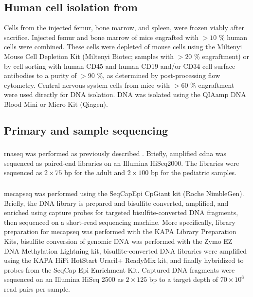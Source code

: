 \subsection{Human cell isolation from }

Cells from the injected femur, bone marrow, and spleen, were frozen viably after sacrifice.
Injected femur and bone marrow of mice engrafted with $> 10$ \% human cells were combined.
These cells were depleted of mouse cells using the Miltenyi Mouse Cell Depletion Kit (Miltenyi Biotec; samples with $> 20$ \% engraftment) or by cell sorting with human CD45 and human CD19 and/or CD34 cell surface antibodies to a purity of $> 90$ \%, as determined by post-processing flow cytometry.
Central nervous system cells from mice with $> 60$ \% engraftment were used directly for DNA isolation.
DNA was isolated using the QIAamp DNA Blood Mini or Micro Kit (Qiagen).

\subsection{Primary and  sample sequencing}

\subsubsection{}

\Gls{rnaseq} was performed as previously described \cite{dobsonRelapseFatedLatentDiagnosis2020}.
Briefly, amplified \gls{cdna} was sequenced as paired-end libraries on an Illumina HiSeq2000.
The libraries were sequenced as $2 \times 75$ bp for the adult and $2 \times 100$ bp for the pediatric samples.

\subsubsection{}

\Gls{mecapseq} was performed using the SeqCapEpi CpGiant kit (Roche NimbleGen).
Briefly, the DNA library is prepared and bisulfite converted, amplified, and enriched using capture probes for targeted bisulfite-converted DNA fragments, then sequenced on a short-read sequencing machine.
More specifically, library preparation for \gls{mecapseq} was performed with the KAPA Library Preparation Kits, bisulfite conversion of genomic DNA was performed with the Zymo EZ DNA Methylation Lightning kit,
bisulfite-converted DNA libraries were amplified using the KAPA HiFi HotStart Uracil+ ReadyMix kit, and finally hybridized to probes from the SeqCap Epi Enrichment Kit.
Captured DNA fragments were sequenced on an Illumina HiSeq 2500 as $2 \times 125$ bp to a target depth of $70 \times 10^6$ read pairs per sample.

